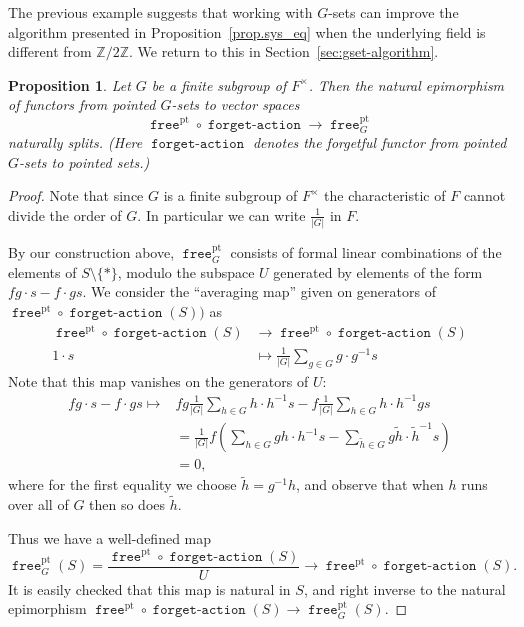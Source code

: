 \documentclass[a4paper]{amsart}
\theoremstyle{plain}
\newtheorem{proposition}[theorem]{Proposition}
\theoremstyle{definition}
\theoremstyle{remark}
\newcommand{\funct}[1]{\operatorname{\mathtt{#1}}}
\newcommand{\Z}{\mathbb{Z}}
\begin{document}
The previous example suggests that working with $G$-sets can improve the algorithm presented in Proposition~\ref{prop.sys_eq} when the underlying field is different from $\Z/2\Z$. We return to this in Section~\ref{sec:gset-algorithm}.

\begin{proposition} \label{prop.free-G_split}
Let \( G \) be a finite subgroup of \( F^{\times} \). Then the natural epimorphism of functors from pointed \( G \)-sets to vector spaces
\[ \funct{free}^\mathrm{pt} \circ \funct{forget-action} \to \funct{free}^\mathrm{pt}_G \]
naturally splits. (Here \( \funct{forget-action} \) denotes the forgetful functor from pointed \( G \)-sets to pointed sets.)
\end{proposition}

\begin{proof}
Note that since \( G \) is a finite subgroup of \( F^{\times} \) the characteristic of \( F \) cannot divide the order of \( G \). In particular we can write \( \frac{1}{|G|} \) in \( F \). 

By our construction above, \( \funct{free}^\mathrm{pt}_G \) consists of formal linear combinations of the elements of \( S \setminus \{*\} \), modulo the subspace \( U \) generated by elements of the form \( fg \cdot s - f \cdot gs \). 
We consider the ``averaging map'' given on generators of \( \funct{free}^\mathrm{pt} \circ \funct{forget-action} (S)) \) as
\begin{align*}
\funct{free}^\mathrm{pt} \circ \funct{forget-action} (S) & \to \funct{free}^\mathrm{pt} \circ \funct{forget-action}(S) \\
1 \cdot s & \mapsto \frac{1}{|G|} \sum_{g \in G} g \cdot g^{-1} s
\end{align*}
Note that this map vanishes on the generators of \( U \):
\begin{align*}
fg \cdot s - f \cdot gs \mapsto & fg \frac{1}{|G|} \sum_{h \in G} h \cdot h^{-1} s - f \frac{1}{|G|} \sum_{h \in G} h \cdot h^{-1} g s \\
& = \frac{1}{|G|} f \left( \sum_{h \in G} gh \cdot h^{-1}s - \sum_{\tilde{h} \in G} g \tilde{h} \cdot \tilde{h}^{-1} s \right) \\
& = 0,
\end{align*}
where for the first equality we choose \( \tilde{h} = g^{-1} h \), and observe that when \( h \) runs over all of \( G \) then so does \( \tilde{h} \).

Thus we have a well-defined map
\[ \funct{free}^\mathrm{pt}_G(S) = \frac{ \funct{free}^\mathrm{pt} \circ \funct{forget-action}(S)}{U} \to  \funct{free}^\mathrm{pt} \circ \funct{forget-action}(S). \]
It is easily checked that this map is natural in \( S \), and right inverse to the natural epimorphism \( \funct{free}^\mathrm{pt} \circ \funct{forget-action}(S) \to \funct{free}^\mathrm{pt}_G(S) \). 
\end{proof}
\end{document}

